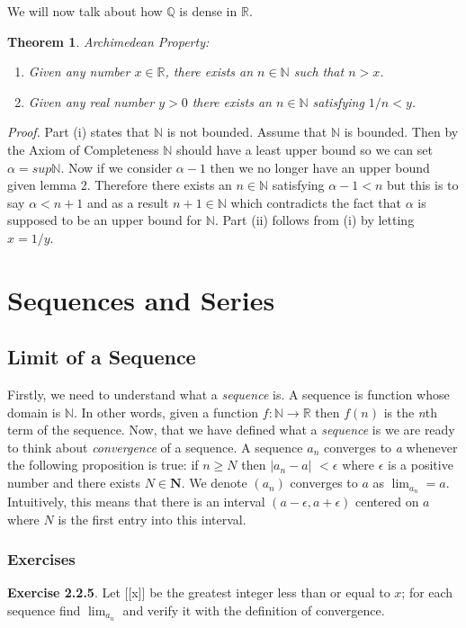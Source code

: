 \documentclass[10pt]{article}
\newtheorem{theorem}{Theorem}
\begin{document}
We will now talk about how $\mathbb{Q}$ is dense in $\mathbb{R}$.
\begin{theorem}
Archimedean Property: 
\begin{enumerate}[label=(\roman*)]
\item \textit{Given any number $x \in \mathbb{R}$, there exists an $n \in \mathbb{N}$ such that $n > x$}.
\item \textit{Given any real number $y>0$ there exists an $n \in \mathbb{N}$ satisfying $1/n < y$}.
\end{enumerate}

\end{theorem}
\textit{Proof.} Part (i) states that $\mathbb{N}$ is not bounded. Assume that $\mathbb{N}$ is bounded. Then by the Axiom of Completeness $\mathbb{N}$ should have a least upper bound so we can set $\alpha = sup \mathbb{N}$. Now if we consider $\alpha - 1$ then we no longer have an upper bound given lemma 2. Therefore there exists an $n \in \mathbb{N}$ satisfying $\alpha - 1 < n$ but this is to say $\alpha < n + 1$ and as a result $n+1 \in \mathbb{N}$ which contradicts the fact that $\alpha$ is supposed to be an upper bound for $\mathbb{N}$. Part (ii) follows from (i) by letting $x=1/y$.
\section{Sequences and Series}

\subsection{Limit of a Sequence}
Firstly, we need to understand what a \textit{sequence} is. A sequence is function whose domain is $\mathbb{N}$. In other words, given a function $f: \mathbb{N} \to \mathbb{R}$ then $f(n)$ is the \textit{n}th term of the sequence.
Now, that we have defined what a \textit{sequence} is  we are ready to think about \textit{convergence} of a sequence. A sequence $a_{n}$ converges to \textit{a} whenever the following proposition is true: if $n \ge N$ then $\left|a_{n}-a\right|$ $< \epsilon$ where $\epsilon$ is a positive number and there exists $N \in \mathbf{N}$. We denote $\left(a_{n}\right)$ converges to $a$ as $\lim_{a_{n}} = a$. Intuitively, this means that there is an interval $\left(a-\epsilon, a+\epsilon\right)$ centered on $a$ where $N$ is the first entry into this interval.
\subsubsection{Exercises}
\textbf{Exercise 2.2.5}. Let [[x]] be the greatest integer less than or equal to $x$; for each sequence find $\lim_{a_{n}}$ and verify it with the definition of convergence.
\end{document}
